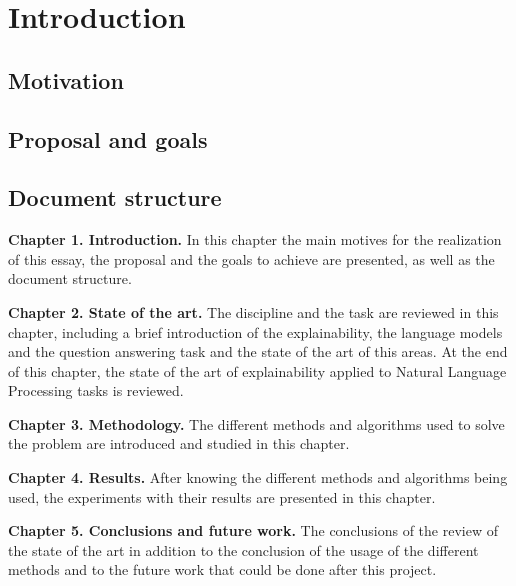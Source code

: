 
\chapter{Introduction}
\label{ch:Introduction}

\section{Motivation}
\label{sec:Motivation}
\noindent

\section{Proposal and goals}
\label{sec:ProposalAndGoals}
\noindent

\section{Document structure}
\label{sec:DocumentStructure}
\noindent

\begin{description}
\item \textbf{Chapter 1. Introduction.} In this chapter the main motives for the realization of this essay, the proposal and the goals to achieve are presented, as well as the document structure.
\item \textbf{Chapter 2. State of the art.} The discipline and the task are reviewed in this chapter, including a brief introduction of the explainability, the language models and the question answering task and the state of the art of this areas. At the end of this chapter, the state of the art of explainability applied to Natural Language Processing tasks is reviewed.
\item \textbf{Chapter 3. Methodology.}  The different methods and algorithms used to solve the problem are introduced and studied in this chapter.
\item \textbf{Chapter 4. Results.} After knowing the different methods and algorithms being used, the experiments with their results are presented in this chapter.
\item \textbf{Chapter 5. Conclusions and future work.} The conclusions of the review of the state of the art in addition to the conclusion of the usage of the different methods and to the future work that could be done after this project.
\end{description} 